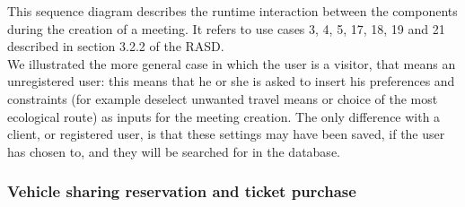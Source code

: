 \documentclass[a4paper,leqno]{article}
\begin{document}
This sequence diagram describes the runtime interaction between the components during the creation of a meeting. It refers to use cases 3, 4, 5, 17, 18, 19 and 21 described in section 3.2.2 of the RASD.\\
We illustrated the more general case in which the user is a visitor, that means
an unregistered user: this means that he or she is asked to insert his preferences and constraints (for example deselect unwanted travel means or choice of the most ecological
route) as inputs for the meeting creation. The only difference with a client, or registered user, is that these settings may have been saved, if the user has chosen to,
and they will be searched for in the database.


\subsubsection{Vehicle sharing reservation and ticket purchase}
\end{document}

